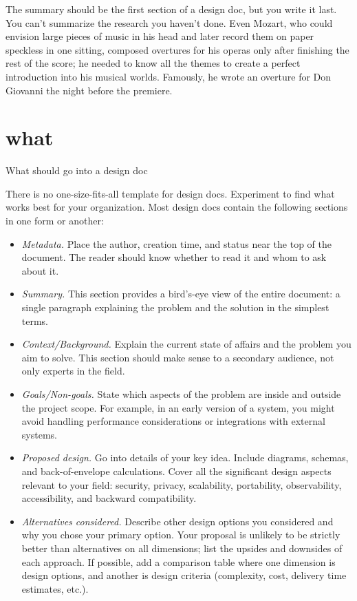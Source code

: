 \documentclass{article}
\begin{document}
The summary should be the first section of a design doc, but you write it last.
You can't summarize the research you haven't done.
Even Mozart, who could envision large pieces of music in his head and later record them on paper speckless in one sitting, composed overtures for his operas only after finishing the rest of the score; he needed to know all the themes to create a perfect introduction into his musical worlds.
Famously, he wrote an overture for Don Giovanni the night before the premiere.

\section{what}{What should go into a design doc}

There is no one-size-fits-all template for design docs.
Experiment to find what works best for your organization.
Most design docs contain the following sections in one form or another:
\begin{itemize}
\item \emph{Metadata.}
  Place the author, creation time, and status near the top of the document.
  The reader should know whether to read it and whom to ask about it.
\item \emph{Summary.}
  This section provides a bird's-eye view of the entire document: a single paragraph explaining the problem and the solution in the simplest terms.
\item \emph{Context/Background.}
  Explain the current state of affairs and the problem you aim to solve.
  This section should make sense to a secondary audience, not only experts in the field.
\item \emph{Goals/Non-goals.}
  State which aspects of the problem are inside and outside the project scope.
  For example, in an early version of a system, you might avoid handling performance considerations or integrations with external systems.
\item \emph{Proposed design.}
  Go into details of your key idea.
  Include diagrams, schemas, and back-of-envelope calculations.
  Cover all the significant design aspects relevant to your field: security, privacy, scalability, portability, observability, accessibility, and backward compatibility.
\item \emph{Alternatives considered.}
  Describe other design options you considered and why you chose your primary option.
  Your proposal is unlikely to be strictly better than alternatives on all dimensions; list the upsides and downsides of each approach.
  If possible, add a comparison table where one dimension is design options, and another is design criteria (complexity, cost, delivery time estimates, etc.).
\end{itemize}
\end{document}
